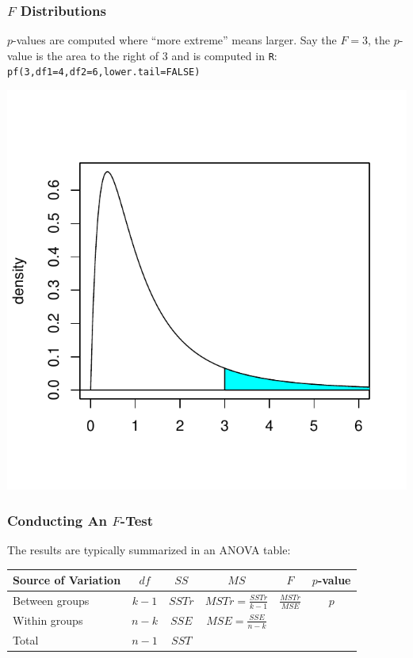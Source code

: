 \documentclass[handout]{beamer}
\newcommand{\blue}[1]{\textcolor{blue2}{#1}}
\begin{document}
\begin{frame}
\frametitle{$F$ Distributions}
$p$-values are computed where ``more extreme'' means \blue{larger}.  Say the $F=3$, the $p$-value is the \blue{area to the right of 3} and is computed in {\tt R}: {\tt pf(3,df1=4,df2=6,lower.tail=FALSE)}
\begin{center}
\includegraphics{figure/lec22-010}
\end{center}
\end{frame}


\begin{frame}
\frametitle{Conducting An $F$-Test}
The results are typically summarized in an \blue{ANOVA table}:

\begin{small}
\begin{center}
\begin{tabular}{l|ccc|cc}
Source of Variation & $df$ & $SS$ & $MS$ & $F$ & $p$-value\\
\hline
Between groups & $k-1$ & $SSTr$ & $MSTr = \frac{SSTr}{k-1}$ & $\frac{MSTr}{MSE}$ & $p$\\
Within groups & $n-k$ & $SSE$ & $MSE = \frac{SSE}{n-k}$ & & \\
\hline
Total & $n-1$ & $SST$ &  & & 
\end{tabular}
\end{center}
\end{small}
\end{frame}
\end{document}
